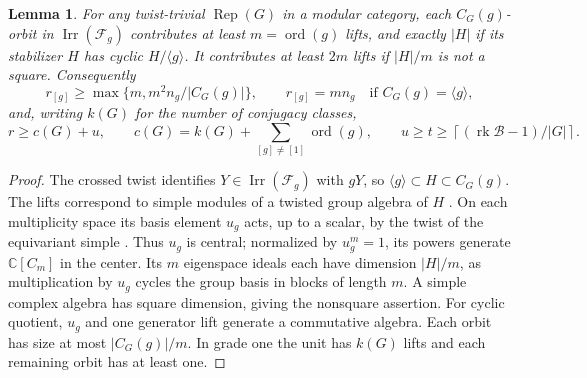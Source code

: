 \documentclass[11pt]{amsart}
\numberwithin{equation}{section}
\newtheorem{lemma}[theorem]{Lemma}
\theoremstyle{definition}
\theoremstyle{plain}
\DeclareMathOperator{\Irr}{Irr}
\begin{document}
\begin{lemma}\label{ext:sector}
For any twist-trivial $\operatorname{Rep}(G)$ in a modular category,
each $C_G(g)$-orbit in $\Irr(\mathcal F_g)$ contributes at least
$m=\operatorname{ord}(g)$ lifts, and exactly $|H|$ if its stabilizer
$H$ has cyclic $H/\langle g\rangle$. It contributes at least $2m$
lifts if $|H|/m$ is not a square. Consequently
\[
 r_{[g]}\ge\max\{m,m^2 n_g/|C_G(g)|\},\qquad
 r_{[g]}=mn_g\quad\text{if } C_G(g)=\langle g\rangle ,
\]
and, writing $k(G)$ for the number of conjugacy classes,
\begin{equation}\label{ext:rankcontrol}
 r\ge c(G)+u,\qquad c(G)=k(G)+\sum_{[g]\ne[1]}\operatorname{ord}(g),
 \qquad u\ge t\ge\left\lceil(\operatorname{rk}\mathcal B-1)/|G|\right\rceil .
\end{equation}
\end{lemma}
\begin{proof}
The crossed twist identifies $Y\in\Irr(\mathcal F_g)$ with $gY$, so
$\langle g\rangle\subset H\subset C_G(g)$. The lifts correspond to
simple modules of a twisted group algebra of $H$ \cite[Corollary~2.13]{BN}.
On each multiplicity space its basis element $u_g$ acts, up to a
scalar, by the twist of the equivariant simple \cite[Theorem~3.9]{Kirillov}.
Thus $u_g$ is central; normalized by $u_g^m=1$, its powers generate
$\mathbb C[C_m]$ in the center. Its $m$ eigenspace ideals each have
dimension $|H|/m$, as multiplication by $u_g$ cycles the group basis
in blocks of length $m$. A simple complex algebra has square
dimension, giving the nonsquare assertion. For cyclic quotient,
$u_g$ and one generator lift generate a commutative algebra.
Each orbit has size at most $|C_G(g)|/m$. In grade one the unit has
$k(G)$ lifts and each remaining orbit has at least one.
\end{proof}
\end{document}
